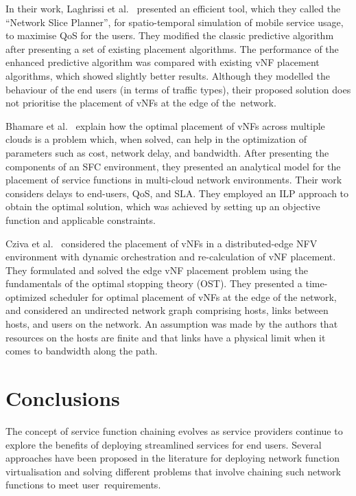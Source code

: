 \documentclass[futureinternet,review,accept,pdftex,moreauthors]{Definitions/mdpi}
\begin{document}
In their work, Laghrissi {et al.}~\cite{laghrissi2017towards} presented an efficient tool, which they called the “Network Slice Planner”, for spatio-temporal simulation of mobile service usage, to maximise QoS for the users. They modified the classic predictive algorithm after presenting a set of existing placement algorithms. The performance of the enhanced predictive algorithm was compared with existing vNF placement algorithms, which showed slightly better results. Although they modelled the behaviour of the end users (in terms of traffic types), their proposed solution does not prioritise the placement of vNFs at the edge of the~network. 

Bhamare {et al.}~\cite{bhamare2017optimal} explain how the optimal placement of vNFs across multiple clouds is a problem which, when solved, can help in the optimization of parameters such as cost, network delay, and bandwidth. After presenting the components of an SFC environment, they presented an analytical model for the placement of service functions in multi-cloud network environments. Their work  considers delays to end-users, QoS, and SLA. They employed an ILP approach to obtain the optimal solution,  which was achieved by setting up an objective function and applicable constraints. 

Cziva {et al.}~\cite{cziva2018dynamic} considered the placement of vNFs in a distributed-edge NFV environment with dynamic orchestration and re-calculation of vNF placement. They formulated and solved the edge vNF placement problem using the fundamentals of the optimal stopping theory (OST). They presented a time-optimized scheduler for optimal placement of vNFs at the edge of the network, and considered an undirected network graph comprising hosts, links between hosts, and users on the network. An assumption was made by the authors that resources on the hosts are finite and that links have a physical limit when it comes to bandwidth along the path. 



\section{Conclusions}
\label{Conclusion}

The concept of service function chaining evolves as service providers continue to explore the benefits of deploying streamlined services for end users. Several approaches have been proposed in the literature for deploying network function virtualisation and solving different problems that involve chaining such network functions to meet user~requirements.
\end{document}

